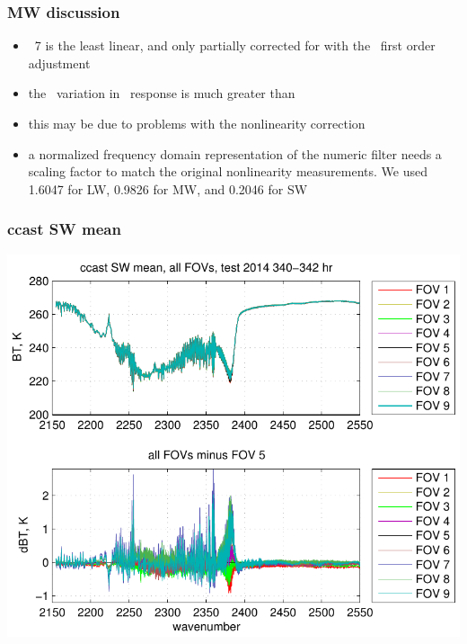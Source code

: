 \documentclass[11pt]{beamer}
\begin{document}
\begin{frame}
\frametitle{MW discussion}

\begin{itemize}

  \item \fov\ 7 is the least linear, and only partially corrected
    for with the \ccast\ first order adjustment

  \item the \noaa\ variation in \fov\ response is much greater than
    {\ccast}

  \item this may be due to problems with the nonlinearity correction

  \item a normalized frequency domain representation of the numeric
    filter needs a scaling factor to match the original nonlinearity
    measurements.  We used 1.6047 for LW, 0.9826 for MW, and 0.2046
    for SW

\end{itemize}

\end{frame}
\begin{frame}
\frametitle{ccast SW mean}

\begin{center}
  \includegraphics[scale=0.7]{figures/ccast_SW_avg_2014_340-342_hr.pdf}
\end{center}

\end{frame}
\end{document}

